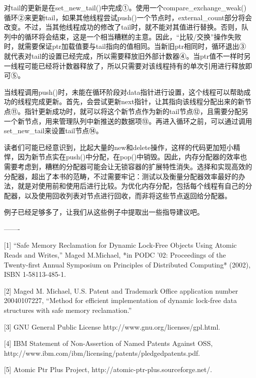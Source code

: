 对tail的更新是在set\_new\_tail()中完成①。使用一个compare\_exchange\_weak()循环②来更新tail，如果其他线程尝试push()一个节点时，external\_count部分将会改变。不过，当其他线程成功的修改了tail时，就不能对其值进行替换。否则，队列中的循环将会结束，这是一个相当糟糕的主意。因此，“比较/交换”操作失败时，就需要保证ptr加载值要与tail指向的值相同。当新旧ptr相同时，循环退出③就代表对tail的设置已经完成，所以需要释放旧外部计数器④。当ptr值不一样时另一线程可能已经将计数器释放了，所以只需要对该线程持有的单次引用进行释放即可⑤。

当线程调用push()时，未能在循环阶段对data指针进行设置，这个线程可以帮助成功的线程完成更新。首先，会尝试更新next指针，让其指向该线程分配出来的新节点⑪。指针更新成功时，就可以将这个新节点作为新的tail节点⑫，且需要分配另一个新节点，用来管理队列中新推送的数据项⑬。再进入循环之前，可以通过调用set\_new\_tail来设置tail节点⑭。

读者们可能已经意识到，比起大量的new和delete操作，这样的代码更加短小精悍，因为新节点实在push()中分配，在pop()中销毁。因此，内存分配器的效率也需要考虑到，糟糕的分配器可能会让无锁容器的扩展特性消失。选择和实现高效的分配器，超出了本书的范畴，不过需要牢记：测试以及衡量分配器效率最好的办法，就是对使用前和使用后进行比较。为优化内存分配，包括每个线程有自己的分配器，以及使用回收列表对节点进行回收，而非将这些节点返回给分配器。

例子已经足够多了，让我们从这些例子中提取出一些指导建议吧。

-------

[1] “Safe Memory Reclamation for Dynamic Lock-Free Objects Using Atomic Reads and Writes,” Maged M.Michael, *in PODC ’02: Proceedings of the Twenty-first Annual Symposium on Principles of Distributed Computing* (2002), ISBN 1-58113-485-1.

[2] Maged M. Michael, U.S. Patent and Trademark Office application number 20040107227, “Method for efficient implementation of dynamic lock-free data structures with safe memory reclamation.”

[3] GNU General Public License http://www.gnu.org/licenses/gpl.html.

[4] IBM Statement of Non-Assertion of Named Patents Against OSS, http://www.ibm.com/ibm/licensing/patents/pledgedpatents.pdf.

[5] Atomic Ptr Plus Project, http://atomic-ptr-plus.sourceforge.net/.